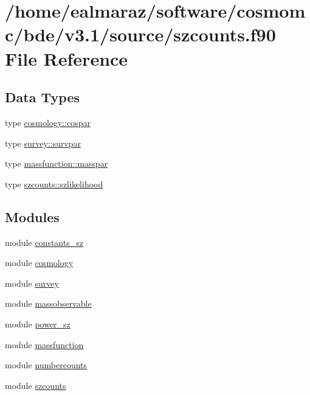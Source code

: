 \hypertarget{szcounts_8f90}{}\section{/home/ealmaraz/software/cosmomc/bde/v3.1/source/szcounts.f90 File Reference}
\label{szcounts_8f90}
\subsection*{Data Types}
\begin{DoxyCompactItemize}
\item 
type \mbox{\hyperlink{structcosmology_1_1cospar}{cosmology\+::cospar}}
\item 
type \mbox{\hyperlink{structsurvey_1_1survpar}{survey\+::survpar}}
\item 
type \mbox{\hyperlink{structmassfunction_1_1masspar}{massfunction\+::masspar}}
\item 
type \mbox{\hyperlink{structszcounts_1_1szlikelihood}{szcounts\+::szlikelihood}}
\end{DoxyCompactItemize}
\subsection*{Modules}
\begin{DoxyCompactItemize}
\item 
module \mbox{\hyperlink{namespaceconstants__sz}{constants\+\_\+sz}}
\item 
module \mbox{\hyperlink{namespacecosmology}{cosmology}}
\item 
module \mbox{\hyperlink{namespacesurvey}{survey}}
\item 
module \mbox{\hyperlink{namespacemassobservable}{massobservable}}
\item 
module \mbox{\hyperlink{namespacepower__sz}{power\+\_\+sz}}
\item 
module \mbox{\hyperlink{namespacemassfunction}{massfunction}}
\item 
module \mbox{\hyperlink{namespacenumbercounts}{numbercounts}}
\item 
module \mbox{\hyperlink{namespaceszcounts}{szcounts}}
\end{DoxyCompactItemize}
